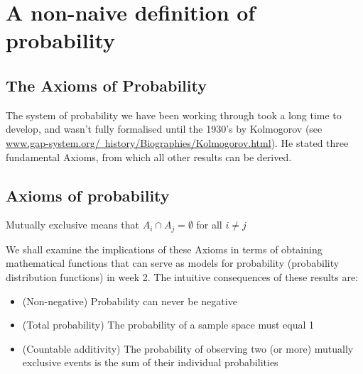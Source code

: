 \documentclass[12pt]{extbook}
\begin{document}
\chapter{A non-naive definition of probability}


\section{The Axioms of Probability}

The system of probability we have been working through took a long time to develop, and wasn't fully formalised until the 1930's by Kolmogorov (see 
\href{http://www.gap-system.org/~history/Biographies/Kolmogorov.html}{\color{blue}www.gap-system.org/~history/Biographies/Kolmogorov.html}).   He stated three fundamental Axioms, from which all other results can be derived.



\section{Axioms of probability}


Mutually exclusive means that $A_i \cap A_j = \emptyset$ for all $i \neq j$


We shall examine the implications of these Axioms in terms of obtaining mathematical functions that can serve as models for probability (probability distribution functions) in week 2.   The intuitive consequences of these results are:

\begin{itemize}
\item (Non-negative) Probability can never be negative
\item (Total probability) The probability of a sample space must equal 1 
\item (Countable additivity) The probability of observing two (or more) mutually exclusive events is the sum of their individual probabilities
\end{itemize}
\end{document}
